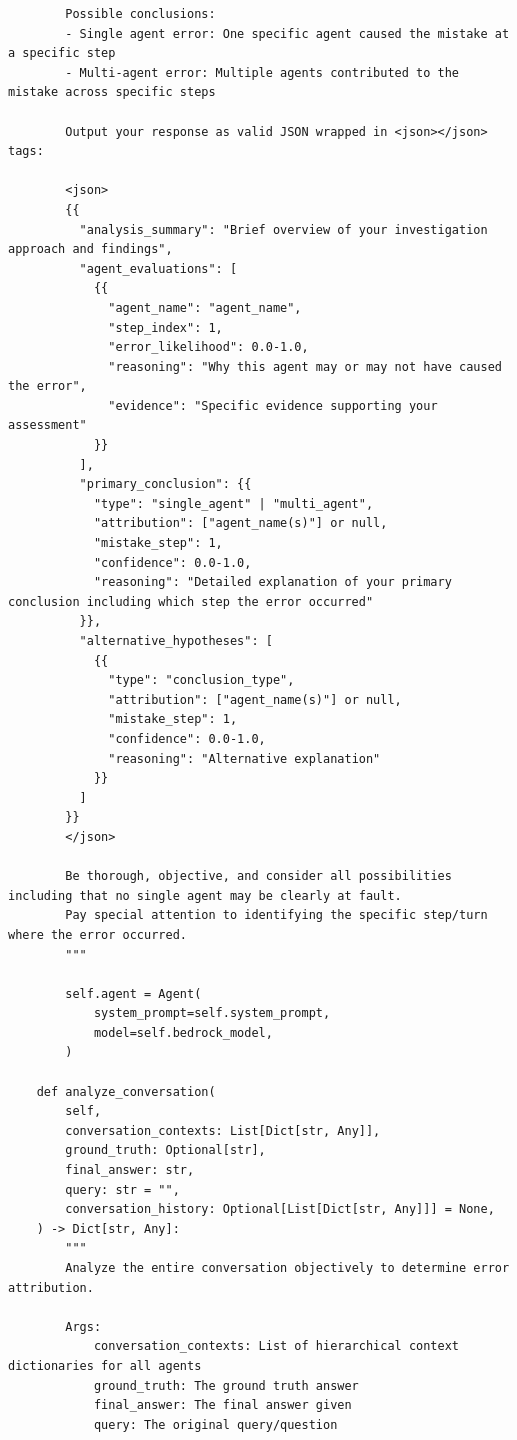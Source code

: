 \documentclass{article}
\begin{document}
\begin{lstlisting}
        Possible conclusions:
        - Single agent error: One specific agent caused the mistake at a specific step
        - Multi-agent error: Multiple agents contributed to the mistake across specific steps
        
        Output your response as valid JSON wrapped in <json></json> tags:
        
        <json>
        {{
          "analysis_summary": "Brief overview of your investigation approach and findings",
          "agent_evaluations": [
            {{
              "agent_name": "agent_name",
              "step_index": 1,
              "error_likelihood": 0.0-1.0,
              "reasoning": "Why this agent may or may not have caused the error",
              "evidence": "Specific evidence supporting your assessment"
            }}
          ],
          "primary_conclusion": {{
            "type": "single_agent" | "multi_agent",
            "attribution": ["agent_name(s)"] or null,
            "mistake_step": 1,
            "confidence": 0.0-1.0,
            "reasoning": "Detailed explanation of your primary conclusion including which step the error occurred"
          }},
          "alternative_hypotheses": [
            {{
              "type": "conclusion_type",
              "attribution": ["agent_name(s)"] or null,
              "mistake_step": 1,
              "confidence": 0.0-1.0,
              "reasoning": "Alternative explanation"
            }}
          ]
        }}
        </json>
        
        Be thorough, objective, and consider all possibilities including that no single agent may be clearly at fault.
        Pay special attention to identifying the specific step/turn where the error occurred.
        """

        self.agent = Agent(
            system_prompt=self.system_prompt,
            model=self.bedrock_model,
        )

    def analyze_conversation(
        self,
        conversation_contexts: List[Dict[str, Any]],
        ground_truth: Optional[str],
        final_answer: str,
        query: str = "",
        conversation_history: Optional[List[Dict[str, Any]]] = None,
    ) -> Dict[str, Any]:
        """
        Analyze the entire conversation objectively to determine error attribution.

        Args:
            conversation_contexts: List of hierarchical context dictionaries for all agents
            ground_truth: The ground truth answer
            final_answer: The final answer given
            query: The original query/question


\end{lstlisting}
\end{document}
